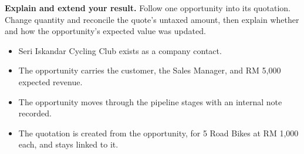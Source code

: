 \begin{verification}
\textbf{Explain and extend your result.} Follow one opportunity into its quotation. Change quantity and reconcile the quote's untaxed amount, then explain whether and how the opportunity's expected value was updated.


\begin{itemize}
  \item Seri Iskandar Cycling Club exists as a company contact.
  \item The opportunity carries the customer, the Sales Manager, and RM 5,000 expected revenue.
  \item The opportunity moves through the pipeline stages with an internal note recorded.
  \item The quotation is created from the opportunity, for 5 Road Bikes at RM 1,000 each, and stays linked to it.
\end{itemize}
\end{verification}
